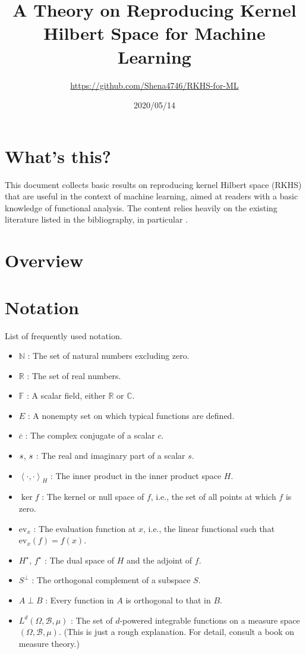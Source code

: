 \documentclass[a4paper,12pt]{article}
\title{A Theory on Reproducing Kernel Hilbert Space for Machine Learning}
\author{\url{https://github.com/Shena4746/RKHS-for-ML}}
\date{2020/05/14}
\theoremstyle{remark}
\theoremstyle{definition}
\theoremstyle{definition}
\theoremstyle{definition}
\newcommand{\ip}[2]{\left<#1, #2 \right>}
\newcommand{\ev}[1]{\mathrm{ev}_{#1}}
\newcommand{\adj}[1]{#1^{\star}}
\let\Re\relax
\DeclareMathOperator{\Re}{Re}
\let\Im\relax
\DeclareMathOperator{\Im}{Im}
\begin{document}
\maketitle
\section*{What's this?}
This document collects basic results on reproducing kernel Hilbert space (RKHS) that are useful in the context of machine learning, aimed at readers with a basic knowledge of functional analysis. The content relies heavily on the existing literature listed in the bibliography, in particular \cite{Berlinet:RKHS} \cite{Christmann-Steinwart:SVM}.
\cite{Cucker-Zhou:Learning-Theory}
\cite{Paulsen-Raghupathi:Intro-RKHS}
\cite{Schlkopf-Smola:Learning-with-kernels}

\section*{Overview}

\tableofcontents

\section*{Notation}
List of frequently used notation.
\begin{itemize}
	\item \( \mathbb{N} \) : The set of natural numbers excluding zero.
	\item \( \mathbb{R} \) : The set of real numbers.
	\item \( \mathbb{F} \) : A scalar field, either \( \mathbb{R} \) or \( \mathbb{C} \).
	\item \( E \) : A nonempty set on which typical functions are defined.
	\item \( \overline{c} \) : The complex conjugate of a scalar \( c \).
	\item \( \Re s \), \( \Im s \) : The real and imaginary part of a scalar \( s \).
	\item \( \ip{\cdot }{\cdot }_{H} \) : The inner product in the inner product space \( H \).
	\item \( \ker f \) : The kernel or null space of \( f \), i.e., the set of all points at which \( f \) is zero.
	\item \( \ev{x} \) : The evaluation function at \( x \), i.e., the linear functional such that \( \ev{x}(f) = f(x) \).
	\item \( \adj{H} \), \( \adj{f} \) : The dual space of \( H \) and the adjoint of \( f \).
	\item \( S^{\perp } \) : The orthogonal complement of a subspace \( S \).
	\item \( A \perp B\) : Every function in \( A \) is orthogonal to that in \( B \).
	\item \( L^d(\Omega, \mathscr{B}, \mu) \) : The set of \( d \)-powered integrable functions on a measure space \( (\Omega, \mathscr{B}, \mu) \). (This is just a rough explanation. For detail, consult a book on measure theory.)
\end{itemize}
\clearpage
\end{document}
